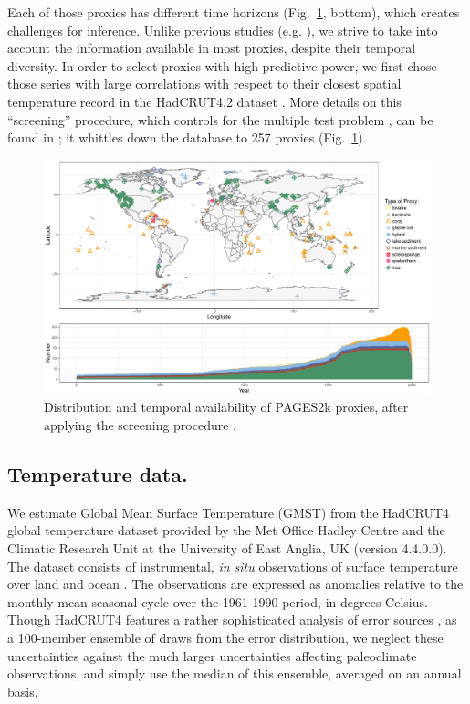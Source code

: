 \documentclass[12pt]{amsart}
\theoremstyle{plain}
\theoremstyle{definition}
\theoremstyle{remark}
\newcommand{\lb}[1]{\color{MidnightBlue}\textbf{[LB: #1]}\normalcolor}
\newcommand{\jeg}[1]{\color{ProcessBlue}\textbf{[JEG: #1]}\normalcolor}
\begin{document}
 Each of those proxies has different time horizons (Fig.~\ref{fig:proxy}, bottom), which creates challenges for inference. Unlike previous studies (e.g. \cite{Barboza2014}), we strive to take into account the information available in most proxies, despite their temporal diversity.
In order to select proxies with high predictive power, we first chose those series with large correlations with respect to
their closest spatial temperature record in the HadCRUT4.2 dataset \citep{Morice2012}. More
details on this ``screening'' procedure, which controls for the multiple test problem \citep{BenjaminiHochberg95}, can be found in \citet{PAGES2kSD2017short}; it whittles down the database to 257 proxies (Fig.~\ref{fig:proxy}).   
\begin{figure}
  \centering
  \includegraphics[scale=0.40]{CombinedMap_Area}
  \caption{Distribution and temporal availability of PAGES2k proxies, after applying the screening procedure \cite{PAGES2kSD2017short}.}
  \label{fig:proxy}
\end{figure}


\subsection{Temperature data.}
We estimate Global Mean Surface Temperature (GMST) from the HadCRUT4 global temperature dataset provided by the Met Office Hadley
Centre and the Climatic Research Unit at the University of East Anglia, UK
(version 4.4.0.0). The dataset consists of instrumental, {\it in situ}
observations of surface temperature over land \citep{Jones2012} and ocean
\citep{Kennedy2011, Kennedy2011a}. The
observations are expressed as anomalies relative to the monthly-mean seasonal cycle over the 1961-1990 period, in degrees Celsius. Though HadCRUT4 features a rather sophisticated analysis of error sources \citep{Morice2012}, as a 100-member ensemble of draws from the error distribution, we neglect these uncertainties against the much larger uncertainties affecting paleoclimate observations, and simply use the median of this ensemble, averaged on an annual basis.
\end{document}
